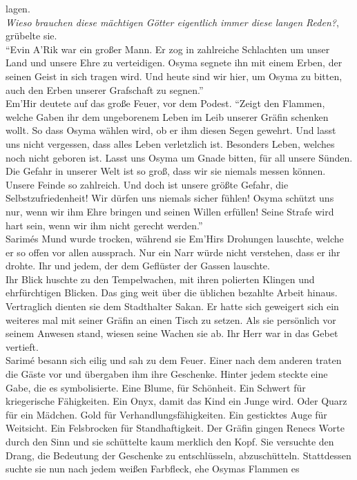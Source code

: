 lagen.\\
\textit{Wieso brauchen diese mächtigen Götter eigentlich immer diese langen Reden?}, grübelte sie.\\
``Evin A'Rik war ein großer Mann. Er zog in zahlreiche Schlachten um unser Land und unsere Ehre 
zu verteidigen. Osyma segnete ihn mit einem Erben, der seinen Geist in sich tragen wird. Und heute 
sind wir hier, um Osyma zu bitten, auch den Erben unserer Grafschaft zu segnen.''\\
Em'Hir deutete auf das große Feuer, vor dem Podest. ``Zeigt den Flammen, welche Gaben ihr dem 
ungeborenem Leben im Leib unserer Gräfin schenken wollt. So dass Osyma wählen wird, ob er ihm 
diesen Segen gewehrt. Und lasst uns nicht vergessen, dass alles Leben verletzlich ist. Besonders 
Leben, welches noch nicht geboren ist. Lasst uns Osyma um Gnade bitten, für all unsere Sünden. 
Die Gefahr in unserer Welt ist so groß, dass wir sie niemals messen können. Unsere Feinde so 
zahlreich. Und doch ist unsere größte Gefahr, die Selbstzufriedenheit! Wir dürfen uns niemals 
sicher fühlen! Osyma schützt uns nur, wenn wir ihm Ehre bringen und seinen Willen erfüllen! 
Seine Strafe wird hart sein, wenn wir ihm nicht gerecht werden.''\\
Sarimés Mund wurde trocken, während sie Em'Hirs Drohungen lauschte, welche er so offen vor allen 
aussprach. Nur ein Narr würde nicht verstehen, dass er ihr drohte. Ihr und jedem, der dem 
Geflüster der Gassen lauschte. \\
Ihr Blick huschte zu den Tempelwachen, mit ihren polierten Klingen und ehrfürchtigen Blicken. Das 
ging weit über die üblichen bezahlte Arbeit hinaus. Vertraglich dienten sie dem Stadthalter 
Sakan. Er hatte sich geweigert sich ein weiteres mal mit seiner Gräfin an einen Tisch zu 
setzen. Als sie persönlich vor seinem Anwesen stand, wiesen seine Wachen sie ab. Ihr Herr war 
in das Gebet vertieft.\\
Sarimé besann sich eilig und sah zu dem Feuer. Einer nach dem anderen traten die Gäste vor und 
übergaben ihm ihre Geschenke. Hinter jedem steckte eine Gabe, die es symbolisierte. Eine Blume, für 
Schönheit. Ein Schwert für kriegerische Fähigkeiten. Ein Onyx, damit das Kind ein Junge wird. Oder 
Quarz für ein Mädchen. Gold für Verhandlungsfähigkeiten. Ein gesticktes Auge für Weitsicht. Ein 
Felsbrocken für Standhaftigkeit. Der Gräfin gingen Renecs Worte durch den Sinn und sie schüttelte 
kaum merklich den Kopf. Sie versuchte den Drang, die Bedeutung der Geschenke zu entschlüsseln, 
abzuschütteln. Stattdessen suchte sie nun nach jedem weißen Farbfleck, ehe Osymas Flammen es 
